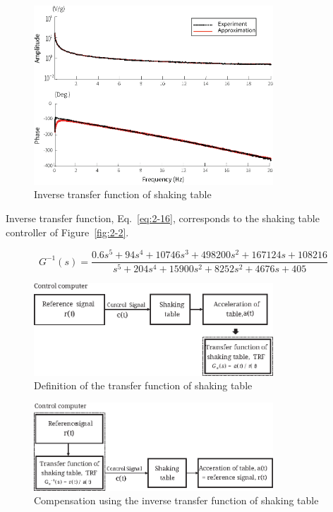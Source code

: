 \begin{figure}[ht]
\centering
\includegraphics[width=0.8\textwidth] {figure/2-7.eps}
\caption{Inverse transfer function of shaking table}
\label{fig:2-7}
\end{figure}

Inverse transfer function, Eq.~\eqref{eq:2-16}, corresponds to the shaking table controller of Figure~\ref{fig:2-2}. 

\begin{equation}\label{eq:2-16}
G^{-1}(s) = \frac{0.6s^5 + 94s^4 + 10746s^3 + 498200s^2 + 167124s + 108216}{s^5 + 204s^4 + 15900s^2 + 8252s^2 + 4676s + 405}
\end{equation}

\begin{figure}[ht]
\centering
\includegraphics[width=0.8\textwidth] {figure/5-13.eps}
\caption{Definition of the transfer function of shaking table}
\label{fig:5-13}
\end{figure}

\begin{figure}[ht]
\centering
\includegraphics[width=0.8\textwidth] {figure/5-14.eps}
\caption{Compensation using the inverse transfer function of shaking table}
\label{fig:5-14}
\end{figure}

